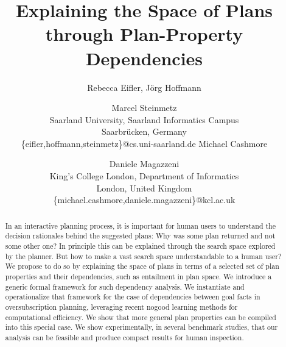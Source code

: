 \documentclass[letterpaper]{article}
\begin{document}
\nocopyright

\title{Explaining the Space of Plans through Plan-Property Dependencies}

\author{
\hspace{1.0cm}Rebecca Eifler, J\"org Hoffmann \and Marcel Steinmetz\\
  \hspace{1.0cm}Saarland University, Saarland Informatics Campus\\
  \hspace{1.0cm}Saarbr\"ucken, Germany\\
  \hspace{1.0cm}\{eifler,hoffmann,steinmetz\}@cs.uni-saarland.de
\And
\hspace{4.0cm}Michael Cashmore \and Daniele Magazzeni\\
\hspace{4.0cm}King's College London, Department of Informatics\\
\hspace{4.0cm}London, United Kingdom\\
\hspace{4.0cm}\{michael.cashmore,daniele.magazzeni\}@kcl.ac.uk 
}

\maketitle

\begin{abstract}
	In an interactive planning process, it is important for human users to understand the decision rationales behind the suggested plans: Why was some plan returned and not some other one? 
	In principle this can be explained through the search space explored by the planner.
	But how to make a vast search space understandable to a human user? 
	We propose to do so by explaining the space of plans in terms of a selected set of plan 
	properties and their dependencies, such as entailment in plan space. 
	We introduce a generic formal framework for such dependency analysis.
	We instantiate and operationalize that framework for the case of dependencies 
	between goal facts in oversubscription planning, leveraging recent nogood learning methods 
	for computational efficiency. We show that more general plan properties can be compiled 
	into this special case. We show experimentally, in several benchmark studies,  
	that our analysis can be feasible and produce compact results for human inspection. 
\end{abstract}











\FloatBarrier


\medskip

\noindent

%
%
\end{document}
